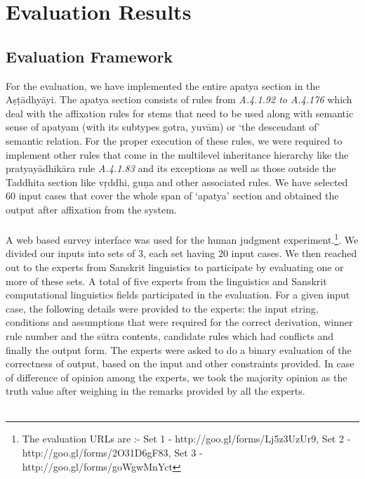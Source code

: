 \documentclass[11pt]{article}
\begin{document}
\section{Evaluation Results}
\label{chapter 5}


\subsection{Evaluation Framework}

For the evaluation, we have implemented the entire apatya section in the Aṣṭādhyāyi. The apatya section consists of rules from {\sl A.4.1.92 to A.4.176} which deal with the affixation rules for stems that need to be used along with semantic sense of apatyam (with its subtypes gotra, yuvām) or `the descendant of' semantic relation. For the proper execution of these rules, we were required to implement other rules that come in the multilevel inheritance hierarchy like the pratyayādhikāra rule {\sl A.4.1.83} and its exceptions as well as those outside the Taddhita section like vṛddhi, guṇa and other associated rules. We have selected 60 input cases that cover the whole span of `apatya' section and obtained the output after affixation from the system.  
\\ \\
A web based survey interface was used for the human judgment experiment.\footnote{The evaluation URLs are :- Set 1 - http://goo.gl/forms/Lj5z3UzUr9, Set 2 - http://goo.gl/forms/2O31D6gF83, Set 3 - http://goo.gl/forms/goWgwMnYct}. We divided our inputs into sets of 3, each set having 20 input cases. We then reached out to the experts from Sanskrit linguistics to participate by evaluating one or more of these sets. A total of five experts from the linguistics and Sanskrit computational linguistics fields participated in the evaluation. For a given input case, the following details were provided to the experts: the input string, conditions and assumptions that were required for the correct derivation, winner rule number and the sūtra contents, candidate rules which had conflicts and finally the output form. The experts were asked to do a binary evaluation of the correctness of output, based on the input and other constraints provided. In case of difference of opinion among the experts, we took the majority opinion as the truth value after weighing in the remarks provided by all the experts.
\\ \\
\end{document}
